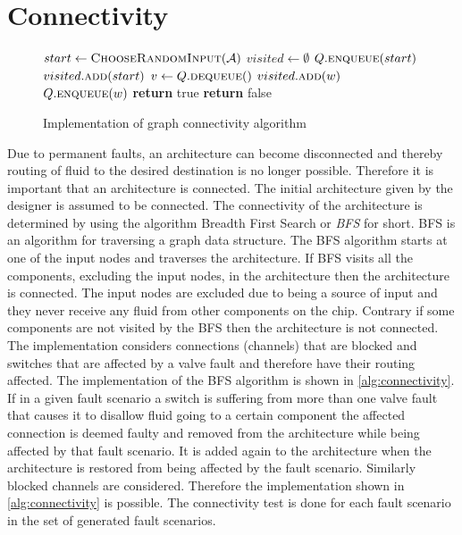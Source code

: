 \section{Connectivity}
\begin{figure}
\centering
\begin{algorithmic}[1]
	\State $start \gets \Call{ChooseRandomInput}{\mathcal{A}}$
	\State $visited \gets \emptyset$
	\State $Q.\Call{enqueue}{start}$
	\State $visited.\Call{add}{start}$
        \State $v \gets Q.\Call{dequeue}{\null}$
		\State $visited.\Call{add}{w}$
		\State $Q.\Call{enqueue}{w}$
		\EndIf
	\EndFor
      \EndWhile
		\State \textbf{return} true
	\Else
		\State \textbf{return} false
	\EndIf
    \EndFunction
\end{algorithmic}
\caption[Implementation of graph connectivity algorithm]{Implementation of graph connectivity algorithm}
\label{alg:connectivity}
\end{figure}
Due to permanent faults, an architecture can become disconnected and thereby routing of fluid to the desired destination is no longer possible. Therefore it is important that an architecture is connected. The initial architecture given by the designer is assumed to be connected. The connectivity of the architecture is determined by using the algorithm Breadth First Search or \emph{BFS} for short. BFS is an algorithm for traversing a graph data structure. The BFS algorithm starts at one of the input nodes and traverses the architecture. If BFS visits all the components, excluding the input nodes, in the architecture then the architecture is connected. The input nodes are excluded due to being a source of input and they never receive any fluid from other components on the chip. Contrary if some components are not visited by the BFS then the architecture is not connected. The implementation considers connections (channels) that are blocked and switches that are affected by a valve fault and therefore have their routing affected. The implementation of the BFS algorithm is shown in \autoref{alg:connectivity}. If in a given fault scenario a switch is suffering from more than one valve fault that causes it to disallow fluid going to a certain component the affected connection is deemed faulty and removed from the architecture while being affected by that fault scenario. It is added again to the architecture when the architecture is restored from being affected by the fault scenario. Similarly blocked channels are considered. Therefore the implementation shown in \autoref{alg:connectivity} is possible. The connectivity test is done for each fault scenario in the set of generated fault scenarios.

